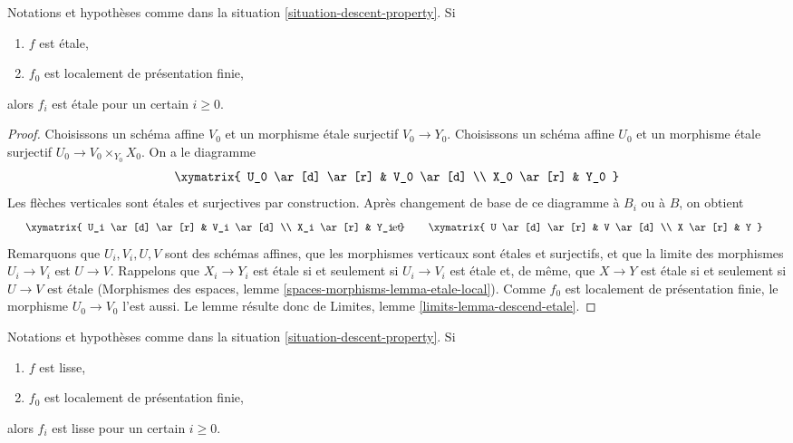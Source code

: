 \begin{lemma}
\label{lemma-descend-etale}
Notations et hypothèses comme dans la
situation \ref{situation-descent-property}. Si
\begin{enumerate}
\item $f$ est étale,
\item $f_0$ est localement de présentation finie,
\end{enumerate}
alors $f_i$ est étale pour un certain $i \geq 0$.
\end{lemma}

\begin{proof}
Choisissons un schéma affine $V_0$ et un morphisme étale surjectif
$V_0 \to Y_0$. Choisissons un schéma affine $U_0$ et un morphisme étale
surjectif $U_0 \to V_0 \times_{Y_0} X_0$. On a le diagramme
$$
\xymatrix{
U_0 \ar[d] \ar[r] & V_0 \ar[d] \\
X_0 \ar[r] & Y_0
}
$$
Les flèches verticales sont étales et surjectives par construction.
Après changement de base de ce diagramme à $B_i$ ou à $B$, on obtient
$$
\vcenter{
\xymatrix{
U_i \ar[d] \ar[r] & V_i \ar[d] \\
X_i \ar[r] & Y_i
}
}
\quad\text{et}\quad
\vcenter{
\xymatrix{
U \ar[d] \ar[r] & V \ar[d] \\
X \ar[r] & Y
}
}
$$
Remarquons que $U_i, V_i, U, V$ sont des schémas affines,
que les morphismes verticaux sont étales et surjectifs, et que la limite des
morphismes $U_i \to V_i$ est $U \to V$. Rappelons que $X_i \to Y_i$ est étale
si et seulement si $U_i \to V_i$ est
étale et, de même, que $X \to Y$ est étale si et seulement si
$U \to V$ est étale
(Morphismes des espaces, lemme \ref{spaces-morphisms-lemma-etale-local}).
Comme $f_0$ est localement de présentation
finie, le morphisme $U_0 \to V_0$ l'est aussi. Le lemme résulte donc
de Limites, lemme \ref{limits-lemma-descend-etale}.
\end{proof}

\begin{lemma}
\label{lemma-descend-smooth}
Notations et hypothèses comme dans la
situation \ref{situation-descent-property}. Si
\begin{enumerate}
\item $f$ est lisse,
\item $f_0$ est localement de présentation finie,
\end{enumerate}
alors $f_i$ est lisse pour un certain $i \geq 0$.
\end{lemma}

